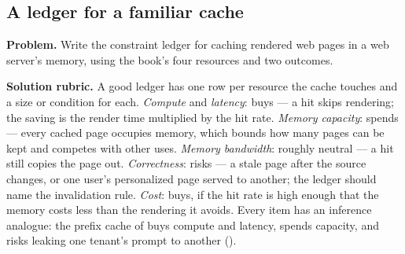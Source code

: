\subsection{A ledger for a familiar cache}
\textbf{Problem.} Write the constraint ledger for caching rendered web pages
in a web server's memory, using the book's four resources and two outcomes.

\textbf{Solution rubric.} A good ledger has one row per resource the cache
touches and a size or condition for each. \emph{Compute} and \emph{latency}:
buys --- a hit skips rendering; the saving is the render time multiplied by the
hit rate. \emph{Memory capacity}: spends --- every cached page occupies
memory, which bounds how many pages can be kept and competes with other uses.
\emph{Memory bandwidth}: roughly neutral --- a hit still copies the page out.
\emph{Correctness}: risks --- a stale page after the source changes, or one
user's personalized page served to another; the ledger should name the
invalidation rule. \emph{Cost}: buys, if the hit rate is high enough that the
memory costs less than the rendering it avoids. Every item has an inference
analogue: the prefix cache of  buys compute and latency,
spends capacity, and risks leaking one tenant's prompt to another
().
